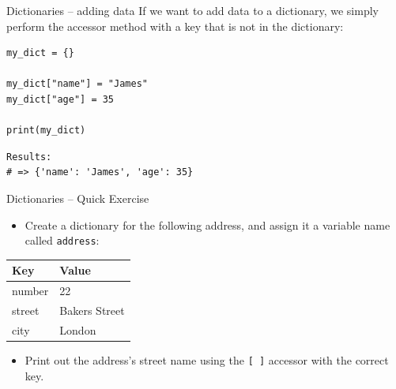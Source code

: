 \documentclass[10pt]{beamer}
\begin{document}
\begin{frame}[label={sec:org272130b},fragile]{Dictionaries -- adding data}
 If we want to add data to a dictionary, we simply perform the accessor method with a
key that is not in the dictionary:

\begin{verbatim}
my_dict = {}

my_dict["name"] = "James"
my_dict["age"] = 35

print(my_dict)
\end{verbatim}

\begin{verbatim}
Results: 
# => {'name': 'James', 'age': 35}
\end{verbatim}
\end{frame}

\begin{frame}[label={sec:orge3644a8},fragile]{Dictionaries -- Quick Exercise}
 \begin{itemize}
\item Create a dictionary for the following address, and assign it a variable name
called \texttt{address}:
\end{itemize}

\begin{center}
\begin{tabular}{ll}
\toprule
Key & Value\\
\midrule
number & 22\\
street & Bakers Street\\
city & London\\
\bottomrule
\end{tabular}
\end{center}

\begin{itemize}
\item Print out the address's street name using the \texttt{[ ]} accessor with the correct key.
\end{itemize}
\end{frame}
\end{document}
